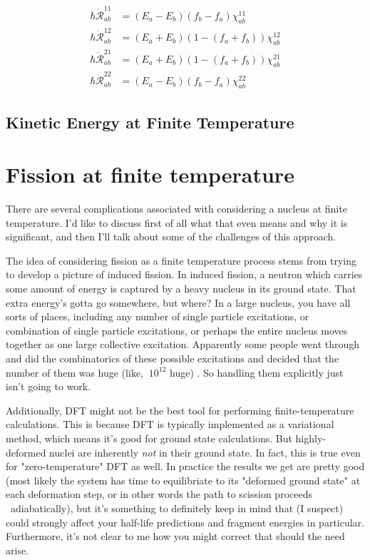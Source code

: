 \begin{align*}
\hbar \dot{\mathcal{R}}_{ab}^{11} &= (E_a-E_b)(f_b-f_a)\chi_{ab}^{11} \\
\hbar \dot{\mathcal{R}}_{ab}^{12} &= (E_a+E_b)\left(1-(f_a+f_b)\right)\chi_{ab}^{12} \\
\hbar \dot{\mathcal{R}}_{ab}^{21} &= (E_a+E_b)\left(1-(f_a+f_b)\right)\chi_{ab}^{21} \\
\hbar \dot{\mathcal{R}}_{ab}^{22} &= (E_a-E_b)(f_b-f_a)\chi_{ab}^{22}
\end{align*}

\subsection*{Kinetic Energy at Finite Temperature}

\section*{Fission at finite temperature}

There are several complications associated with considering a nucleus at finite temperature. I'd like to discuss first of all what that even means and why it is significant, and then I'll talk about some of the challenges of this approach.

The idea of considering fission as a finite temperature process stems from trying to develop a picture of induced fission. In induced fission, a neutron which carries some amount of energy is captured by a heavy nucleus in its ground state. That extra energy's gotta go somewhere, but where? In a large nucleus, you have all sorts of places, including any number of single particle excitations, or combination of single particle excitations, or perhaps the entire nucleus moves together as one large collective excitation. Apparently some people went through and did the combinatorics of these possible excitations and decided that the number of them was huge (like, $~10^{12}$ huge) \cite{Hilaire2012}. So handling them explicitly just isn't going to work.

Additionally, DFT might not be the best tool for performing finite-temperature calculations. This is because DFT is typically implemented as a variational method, which means it's good for ground state calculations. But highly-deformed nuclei are inherently \textit{not} in their ground state. In fact, this is true even for "zero-temperature" DFT as well. In practice the results we get are pretty good (most likely the system has time to equilibriate to its "deformed ground state" at each deformation step, or in other words the path to scission proceeds ~adiabatically), but it's something to definitely keep in mind that (I suspect) could strongly affect your half-life predictions and fragment energies in particular. Furthermore, it's not clear to me how you might correct that should the need arise.


